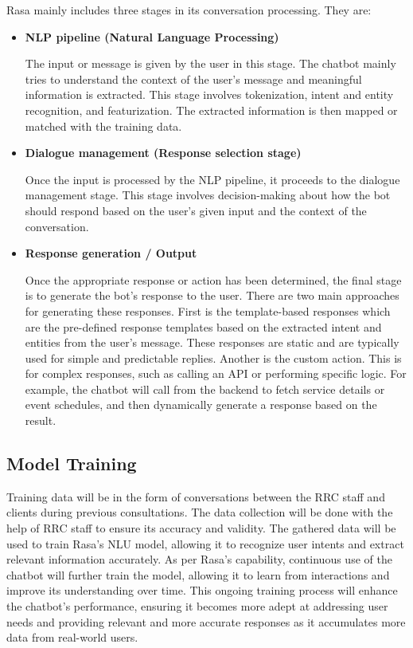 Rasa mainly includes three stages in its conversation processing. They are:

\begin{itemize}
	\item \textbf{NLP pipeline (Natural Language Processing)}
	
	The input or message is given by the user in this stage. The chatbot mainly tries to understand the context of the user’s message and meaningful information is extracted. This stage involves tokenization, intent and entity recognition, and featurization. The extracted information is then mapped or matched with the training data.
	
	\item \textbf{Dialogue management (Response selection stage)}
	
	Once the input is processed by the NLP pipeline, it proceeds to the dialogue management stage. This stage involves decision-making about how the bot should respond based on the user’s given input and the context of the conversation. 
	
	\item \textbf{Response generation / Output}
	
	Once the appropriate response or action has been determined, the final stage is to generate the bot’s response to the user.  There are two main approaches for generating these responses. First is the template-based responses which are the pre-defined response templates based on the extracted intent and entities from the user’s message. These responses are static and are typically used for simple and predictable replies. Another is the custom action. This is for complex responses, such as calling an API or performing specific logic. For example, the chatbot will call from the backend to fetch service details or event schedules, and then dynamically generate a response based on the result.
	
\end{itemize}

\subsection{Model Training}

Training data will be in the form of conversations between the RRC staff and clients during previous consultations. The data collection will be done with the help of RRC staff to ensure its accuracy and validity. The gathered data will be used to train Rasa’s NLU model, allowing it to recognize user intents and extract relevant information accurately. As per Rasa’s capability, continuous use of the chatbot will further train the model, allowing it to learn from interactions and improve its understanding over time. This ongoing training process will enhance the chatbot’s performance, ensuring it becomes more adept at addressing user needs and providing relevant and more accurate responses as it accumulates more data from real-world users.
 
